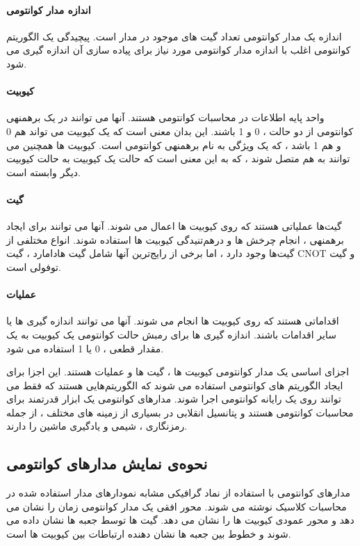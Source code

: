 \documentclass{book}
\begin{document}
\paragraph{اندازه مدار کوانتومی}

اندازه یک مدار کوانتومی تعداد گیت های موجود در مدار است. پیچیدگی یک الگوریتم کوانتومی اغلب با اندازه مدار کوانتومی مورد نیاز برای پیاده سازی آن اندازه گیری می شود.


\paragraph{کیوبیت}

 واحد پایه اطلاعات در محاسبات کوانتومی هستند. آنها می توانند در یک برهمنهی کوانتومی از دو حالت ، 0 و 1 باشند. این بدان معنی است که یک کیوبیت می تواند هم 0 و هم 1 باشد ، که یک ویژگی به نام برهمنهی کوانتومی است. کیوبیت ها همچنین می توانند به هم متصل شوند ، که به این معنی است که حالت یک کیوبیت به حالت کیوبیت دیگر وابسته است.
\paragraph{گیت}
گیت‌ها عملیاتی هستند که روی کیوبیت ها اعمال می شوند. آنها می توانند برای ایجاد برهمنهی ، انجام چرخش ها و درهم‌تنیدگی کیوبیت ها استفاده شوند. انواع مختلفی از  گیت‌ها وجود دارد ، اما برخی از رایج‌ترین آنها شامل گیت هادامارد ، گیت CNOT و گیت توفولی است.

\paragraph{عملیات}

اقداماتی هستند که روی کیوبیت ها انجام می شوند. آنها می توانند اندازه گیری ها یا سایر اقدامات باشند. اندازه گیری ها برای رمبش حالت کوانتومی یک کیوبیت به یک مقدار قطعی ، 0 یا 1 استفاده می شود.



اجزای اساسی یک مدار کوانتومی کیوبیت ها ، گیت ها و عملیات هستند. این اجزا برای ایجاد الگوریتم های کوانتومی استفاده می شوند که الگوریتم‌هایی هستند که فقط می توانند روی یک رایانه کوانتومی اجرا شوند. مدارهای کوانتومی یک ابزار قدرتمند برای محاسبات کوانتومی هستند و پتانسیل انقلابی در بسیاری از زمینه های مختلف ، از جمله رمزنگاری ، شیمی و یادگیری ماشین را دارند.

\subsection{نحوه‌ی نمایش مدار‌های کوانتومی}


مدارهای کوانتومی با استفاده از نماد گرافیکی مشابه نمودارهای مدار استفاده شده در محاسبات کلاسیک نوشته می شوند. محور افقی یک مدار کوانتومی زمان را نشان می دهد و محور عمودی کیوبیت ها را نشان می دهد. گیت ها توسط جعبه ها نشان داده می شوند و خطوط بین جعبه ها نشان دهنده ارتباطات بین کیوبیت ها است.
\end{document}
